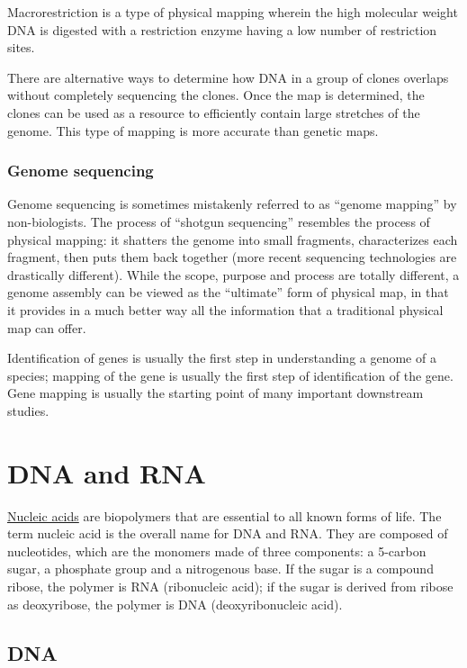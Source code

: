 Macrorestriction is a type of physical mapping wherein the high molecular weight DNA is digested with a restriction enzyme having a low number of restriction sites.

There are alternative ways to determine how DNA in a group of clones overlaps without completely sequencing the clones. Once the map is determined, the clones can be used as a resource to efficiently contain large stretches of the genome. This type of mapping is more accurate than genetic maps.

\hypertarget{genome-sequencing}{%
\subsection{Genome sequencing}\label{genome-sequencing}}

Genome sequencing is sometimes mistakenly referred to as ``genome mapping'' by non-biologists. The process of ``shotgun sequencing'' resembles the process of physical mapping: it shatters the genome into small fragments, characterizes each fragment, then puts them back together (more recent sequencing technologies are drastically different). While the scope, purpose and process are totally different, a genome assembly can be viewed as the ``ultimate'' form of physical map, in that it provides in a much better way all the information that a traditional physical map can offer.

Identification of genes is usually the first step in understanding a genome of a species; mapping of the gene is usually the first step of identification of the gene. Gene mapping is usually the starting point of many important downstream studies.

\hypertarget{dna-and-rna}{%
\chapter{DNA and RNA}\label{dna-and-rna}}

\href{https://en.wikipedia.org/wiki/Nucleic_acid}{Nucleic acids} are biopolymers that are essential to all known forms of life. The term nucleic acid is the overall name for DNA and RNA. They are composed of nucleotides, which are the monomers made of three components: a 5-carbon sugar, a phosphate group and a nitrogenous base. If the sugar is a compound ribose, the polymer is RNA (ribonucleic acid); if the sugar is derived from ribose as deoxyribose, the polymer is DNA (deoxyribonucleic acid).

\hypertarget{dna}{%
\section{DNA}\label{dna}}

